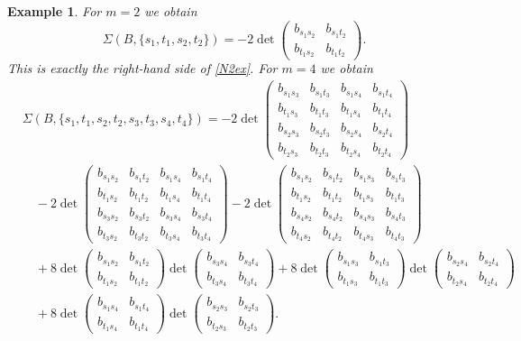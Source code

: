 \documentclass[10pt]{amsart}
\theoremstyle{plain}
\newtheorem{ex}[thm]{Example}
\newcommand{\0}{\color{blue}{\mathsf{0}}}
\begin{document}
\begin{ex}\label{symex1}
For $m=2$ we obtain
\[\Sigma(B,\{s_1,t_1,s_2,t_2\})= -2\det\left(\begin{array}{cc}b_{s_1s_2}&b_{s_1t_2}\\b_{t_1s_2}&b_{t_1t_2}\end{array}\right).\]
This is exactly the right-hand side of \eqref{N2ex}.
For $m=4$ we obtain
\begin{align*}
&\Sigma(B,\{s_1,t_1,s_2,t_2,s_3,t_3,s_4,t_4\})=-2\det\left(\begin{array}{cccc}
b_{s_1s_3}&b_{s_1t_3}&b_{s_1s_4}&b_{s_1t_4}\\
b_{t_1s_3}&b_{t_1t_3}&b_{t_1s_4}&b_{t_1t_4}\\
b_{s_2s_3}&b_{s_2t_3}&b_{s_2s_4}&b_{s_2t_4}\\
b_{t_2s_3}&b_{t_2t_3}&b_{t_2s_4}&b_{t_2t_4}\end{array}\right)\\
&\quad-2\det\left(\begin{array}{cccc}
b_{s_1s_2}&b_{s_1t_2}&b_{s_1s_4}&b_{s_1t_4}\\
b_{t_1s_2}&b_{t_1t_2}&b_{t_1s_4}&b_{t_1t_4}\\
b_{s_3s_2}&b_{s_3t_2}&b_{s_3s_4}&b_{s_3t_4}\\
b_{t_3s_2}&b_{t_3t_2}&b_{t_3s_4}&b_{t_3t_4}\end{array}\right)
-2\det\left(\begin{array}{cccc}
b_{s_1s_2}&b_{s_1t_2}&b_{s_1s_3}&b_{s_1t_3}\\
b_{t_1s_2}&b_{t_1t_2}&b_{t_1s_3}&b_{t_1t_3}\\
b_{s_4s_2}&b_{s_4t_2}&b_{s_4s_3}&b_{s_4t_3}\\
b_{t_4s_2}&b_{t_4t_2}&b_{t_4s_3}&b_{t_4t_3}\end{array}\right)\\
&\quad +8\det\left(\begin{array}{cc}b_{s_1s_2}&b_{s_1t_2}\\b_{t_1s_2}&b_{t_1t_2}\end{array}\right)\det\left(\begin{array}{cc}b_{s_3s_4}&b_{s_3t_4}\\b_{t_3s_4}&b_{t_3t_4}\end{array}\right)+8\det\left(\begin{array}{cc}b_{s_1s_3}&b_{s_1t_3}\\b_{t_1s_3}&b_{t_1t_3}\end{array}\right)\det\left(\begin{array}{cc}b_{s_2s_4}&b_{s_2t_4}\\b_{t_2s_4}&b_{t_2t_4}\end{array}\right)\\
&\quad +8\det\left(\begin{array}{cc}b_{s_1s_4}&b_{s_1t_4}\\b_{t_1s_4}&b_{t_1t_4}\end{array}\right)\det\left(\begin{array}{cc}b_{s_2s_3}&b_{s_2t_3}\\b_{t_2s_3}&b_{t_2t_3}\end{array}\right).
\end{align*}
\end{ex}
\end{document}
